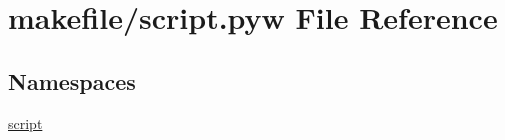 \hypertarget{script_8pyw}{}\section{makefile/script.pyw File Reference}
\label{script_8pyw}
\subsection*{Namespaces}
\begin{DoxyCompactItemize}
\item 
 \hyperlink{namespacescript}{script}
\end{DoxyCompactItemize}
